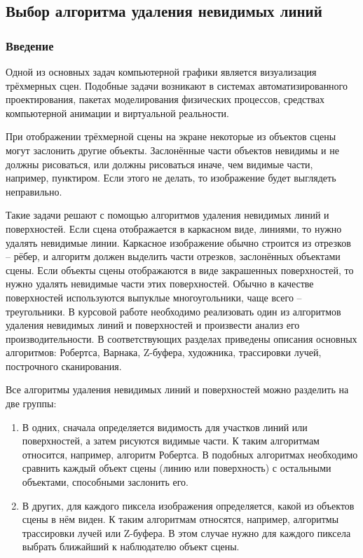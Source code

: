 \subsection{Выбор алгоритма удаления невидимых линий}

\subsubsection{Введение}

\hspace{1.25cm}
Одной из основных задач компьютерной графики является визуализация трёхмерных сцен. Подобные задачи возникают в системах автоматизированного проектирования, пакетах моделирования физических процессов, средствах компьютерной анимации и виртуальной реальности.

При отображении трёхмерной сцены на экране некоторые из объектов сцены могут заслонить другие объекты. Заслонённые части объектов невидимы и не должны рисоваться, или должны рисоваться иначе, чем видимые части, например, пунктиром. Если этого не делать, то изображение будет выглядеть неправильно.

Такие задачи решают с помощью алгоритмов удаления невидимых линий и поверхностей. Если сцена отображается в каркасном виде, линиями, то нужно удалять невидимые линии. Каркасное изображение обычно строится из отрезков – рёбер, и алгоритм должен выделить части отрезков, заслонённых объектами сцены. Если объекты сцены отображаются в виде закрашенных поверхностей, то нужно удалять невидимые части этих поверхностей. Обычно в качестве поверхностей используются выпуклые многоугольники, чаще всего – треугольники.
В курсовой работе необходимо реализовать один из алгоритмов удаления невидимых линий и поверхностей и произвести анализ его производительности. В соответствующих разделах приведены описания основных алгоритмов: Робертса, Варнака, Z-буфера, художника, трассировки лучей, построчного сканирования.

Все алгоритмы удаления невидимых линий и поверхностей можно разделить на две группы:

\begin{enumerate}
	\item В одних, сначала определяется видимость для участков линий или поверхностей, а затем рисуются видимые части. К таким алгоритмам относится, например, алгоритм Робертса. В подобных алгоритмах необходимо сравнить каждый объект сцены (линию или поверхность) с остальными объектами, способными заслонить его.
	\item В других, для каждого пиксела изображения определяется, какой из объектов сцены в нём виден. К таким алгоритмам относятся, например, алгоритмы трассировки лучей или Z-буфера. В этом случае нужно для каждого пиксела выбрать ближайший к наблюдателю объект сцены.
\end{enumerate}

